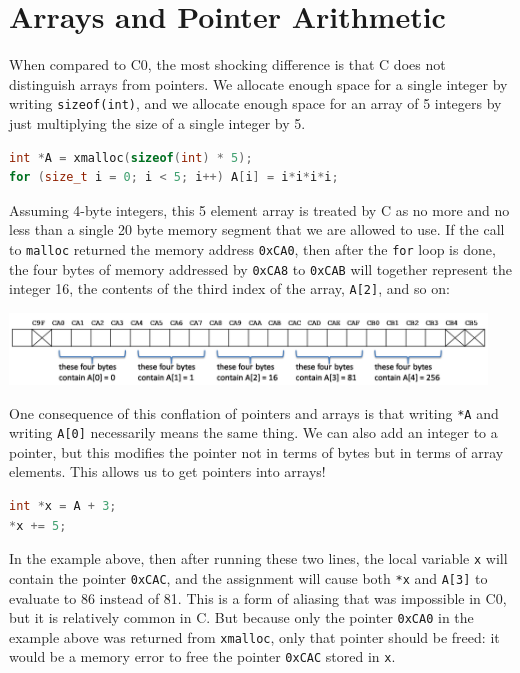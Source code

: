\section{Arrays and Pointer Arithmetic}
\label{sec:mem:pointer_arith}

When compared to C0, the most shocking difference is that C does not
distinguish arrays from pointers. We allocate enough space for a
single integer by writing \lstinline'sizeof(int)', and we allocate enough
space for an array of 5 integers by just multiplying the size of a
single integer by 5.
\begin{lstlisting}[language=c]
int *A = xmalloc(sizeof(int) * 5);
for (size_t i = 0; i < 5; i++) A[i] = i*i*i*i;
\end{lstlisting}

Assuming 4-byte integers, this 5 element array is treated by C as no
more and no less than a single 20 byte memory segment that we are
allowed to use. If the call to \lstinline'malloc' returned the memory
address \lstinline'0xCA0', then after the \lstinline'for' loop is
done, the four bytes of memory addressed by \lstinline'0xCA8' to
\lstinline'0xCAB' will together represent the integer 16, the contents
of the third index of the array, \lstinline'A[2]', and so on:
\begin{center}
\includegraphics[width=0.95\textwidth]{img/allocation.png}
\end{center}

One consequence of this conflation of pointers and arrays is that
writing \lstinline'*A' and writing \lstinline'A[0]' necessarily means
the same thing.  We can also add an integer to a pointer, but this
modifies the pointer not in terms of bytes but in terms of array
elements. This allows us to get pointers into arrays!
\begin{lstlisting}[language=c]
int *x = A + 3;
*x += 5;
\end{lstlisting}
In the example above, then after running these two lines, the local
variable \lstinline'x' will contain the pointer \lstinline'0xCAC', and
the assignment will cause both \lstinline'*x' and \lstinline'A[3]' to
evaluate to 86 instead of 81. This is a form of aliasing that was
impossible in C0, but it is relatively common in C. But because only
the pointer \lstinline'0xCA0' in the example above was returned from
\lstinline'xmalloc', only that pointer should be freed: it would be a
memory error to free the pointer \lstinline'0xCAC' stored in
\lstinline'x'.

